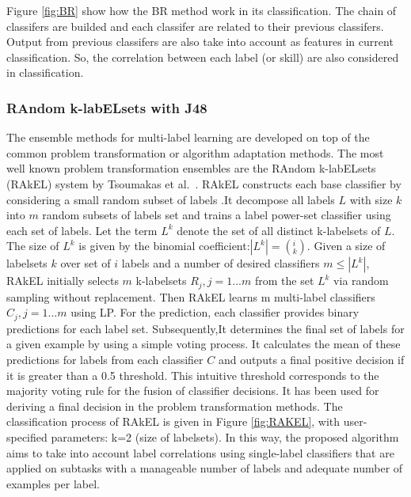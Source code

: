 \documentclass[11pt]{article}
\begin{document}
  Figure \ref{fig:BR} show how the BR method work in its classification. The chain of classifers are builded and each classifer are related to their previous classifers. Output from previous classifers are also take into account as features in current classification. So, the correlation between each label (or skill) are also considered in classification.    

\subsubsection{RAndom k-labELsets with J48}
The ensemble methods for multi-label learning are developed on top of the common problem transformation or algorithm adaptation methods. The most well known problem transformation ensembles are the RAndom k-labELsets (RAkEL) system by Tsoumakas et al.~\cite{Tsoumakas2011random}. RAkEL constructs each base classifier by considering a small random subset of labels .It decompose all labels $L$  with size $k$ into $m$ random subsets of labels set and trains a label power-set classifier
using each set of labels. Let the term $L^k$ denote the set of all distinct k-labelsets of $L$.
The size of $L^k$ is given by the binomial coefficient:$|L^k| =(^i_k)$. Given a size of labelsets $k$ over set of $i$ labels and a number of desired classifiers $m ≤ |L^k|$, RAkEL initially selects $m$ k-labelsets $R_j , j = 1 . . . m$ from the set $L^k$ via random sampling without replacement.  Then RAkEL learns m multi-label classifiers $C_j , j = 1 . . . m$ using LP. For the prediction, each classifier provides binary predictions for each label set. Subsequently,It  determines the final set of labels for a given example by using a simple voting process. It calculates the mean of these predictions for labels 
from each classifier $C$ and outputs a final positive decision if it is greater than a 0.5 threshold. This intuitive threshold corresponds to the majority voting rule for the fusion of classifier decisions. It has been used for deriving a final decision in the problem transformation methods. The classification
process of RAkEL is given in Figure \ref{fig:RAKEL}, with user-specified parameters:  k=2 (size of labelsets). In this way, the proposed algorithm aims to take into account label correlations using single-label classifiers that are applied on subtasks with a manageable number of labels and adequate number of examples per label. \\
\end{document}
